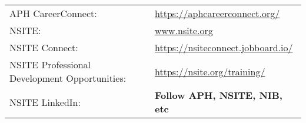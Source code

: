 \begin{table}[h!]
    \centering
    \begin{tabular}{ll}
APH CareerConnect:\dotfill & \href{https://aphcareerconnect.org/}{https://aphcareerconnect.org/}\\
 NSITE:\dotfill & \href{www.nsite.org}{www.nsite.org}\\
 NSITE Connect:\dotfill & \href{https://nsiteconnect.jobboard.io/}{https://nsiteconnect.jobboard.io/}\\
 NSITE Professional Development Opportunities:\dotfill & \href{https://nsite.org/training/}{https://nsite.org/training/}\\
 NSITE LinkedIn:\dotfill & \textbf{Follow APH, NSITE, NIB, etc}\\
    \end{tabular}
\end{table}

